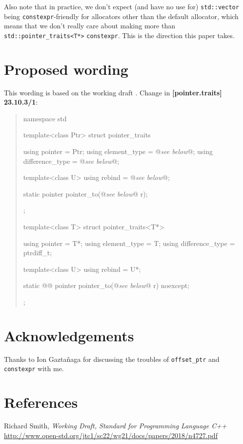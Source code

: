 \documentclass{wg21}
\newcommand{\cc}[1]{\texttt{#1}}
\begin{document}
Also note that in practice, we don't expect (and have no use for) \cc{std::vector}
being \cc{constexpr}-friendly for allocators other than the default allocator,
which means that we don't really care about making more than \cc{std::pointer_traits<T*>}
\cc{constexpr}. This is the direction this paper takes.


\section{Proposed wording}
This wording is based on the working draft \cite{N4727}.
Change in \textbf{[pointer.traits] 23.10.3/1}:

\begin{quote}
\begin{codeblock}
namespace std {
  template<class Ptr> struct pointer_traits {
    using pointer         = Ptr;
    using element_type    = @\textit{see below}@;
    using difference_type = @\textit{see below}@;

    template<class U> using rebind = @\textit{see below}@;

    static pointer pointer_to(@\textit{see below}@ r);
  };

  template<class T> struct pointer_traits<T*> {
    using pointer         = T*;
    using element_type    = T;
    using difference_type = ptrdiff_t;

    template<class U> using rebind = U*;

    static @@ pointer pointer_to(@\textit{see below}@ r) noexcept;
  };
}
\end{codeblock}
\end{quote}



\section{Acknowledgements}
Thanks to Ion Gaztañaga for discussing the troubles of \cc{offset_ptr} and
\cc{constexpr} with me.


\section{References}
\renewcommand{\section}[2]{}%
\begin{thebibliography}{9}

  Richard Smith,
  \emph{Working Draft, Standard for Programming Language C++}\newline
  \url{http://www.open-std.org/jtc1/sc22/wg21/docs/papers/2018/n4727.pdf}

\end{thebibliography}
\end{document}
